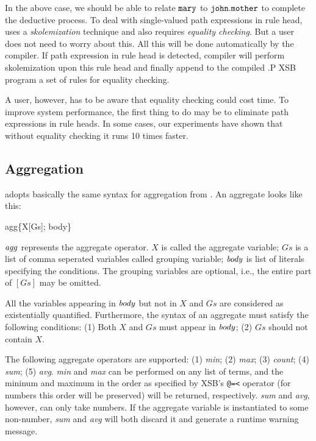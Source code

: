 \documentclass[11pt]{report}
\begin{document}
In the above case, we should be able to relate ${\tt mary}$ to ${\tt john.mother}$ to
complete the deductive process. To deal with single-valued path expressions in rule head,
\FLORA uses a \emph{skolemization} technique and also requires \emph{equality checking}. But a
user does not need to worry about this. All this will be done automatically by the \FLORA
compiler. If path expression in rule head is detected, \FLORA compiler will perform
skolemization upon this rule head and finally append to the compiled .P XSB program a set of
rules for equality checking.

A user, however, has to be aware that equality checking could cost time. To improve system
performance, the first thing to do may be to eliminate path expressions in rule heads. In some
cases, our experiments have shown that without equality checking it runs 10 times faster.

\subsection{Aggregation}

\FLORA adopts basically the same syntax for aggregation from \FLORID. An aggregate
looks like this:
\begin{qrules}
agg\{X[Gs]; body\}
\end{qrules}
${\it agg}$ represents the aggregate operator. $X$ is called the aggregate variable; $Gs$ is
a list of comma seperated variables called grouping variable; ${\it body}$ is list of literals
specifying the conditions. The grouping variables are optional, i.e., the entire part of
$[Gs]$ may be omitted.

All the variables appearing in ${\it body}$ but not in $X$ and $Gs$ are considered as
existentially quantified. Furthermore, the syntax of an aggregate must satisfy the following
conditions: (1) Both $X$ and $Gs$ must appear in ${\it body}$; (2) $Gs$ should not contain $X$.

The following aggregate operators are supported: (1) {\it min}; (2) {\it max}; (3) {\it count};
(4) {\it sum}; (5) {\it avg}. {\it min} and {\it max} can be performed on any list of terms,
and the mininum and maximum in the order as specified by XSB's {\tt @=<} operator (for numbers
this order will be preserved) will be returned, respectively. {\it sum} and {\it avg}, however,
can only take numbers. If the aggregate variable is instantiated to some non-number,
{\it sum} and {\it avg} will both discard it and generate a runtime warning message.
\end{document}
